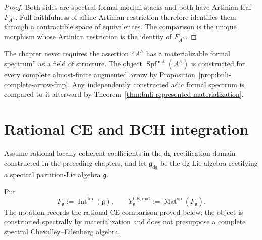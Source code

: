 \begin{proof}
Both sides are spectral formal-moduli stacks and both have Artinian leaf
$F_{A^\wedge}$.  Full faithfulness of affine Artinian restriction therefore
identifies them through a contractible space of equivalences.  The comparison
is the unique morphism whose Artinian restriction is the identity of
$F_{A^\wedge}$.
\end{proof}

\begin{remark}
The chapter never requires the assertion ``$A^\wedge$ has a materializable
formal spectrum'' as a field of structure.  The object
$\operatorname{Spf}^{\mathrm{mat}}(A^\wedge)$ is constructed for every
complete almost-finite augmented arrow by
Proposition~\ref{prop:bnli-complete-arrow-fmp}.  Any independently constructed
adic formal spectrum is compared to it afterward by
Theorem~\ref{thm:bnli-represented-materialization}.
\end{remark}

\section{Rational CE and BCH integration}
\label{sec:bnli-rational-integration}

Assume rational locally coherent coefficients in the dg rectification domain
constructed in the preceding chapters, and let $\mathfrak g_{\mathrm{dg}}$ be
the dg Lie algebra rectifying a spectral partition-Lie algebra $\mathfrak g$.

\begin{definition}
\label{def:bnli-materialized-ce-target}
Put
\[
    F_{\mathfrak g}
    :=
    \operatorname{Int}^{\mathrm{fm}}(\mathfrak g),
    \qquad
    Y^{\mathrm{CE,mat}}_{\mathfrak g}
    :=
    \operatorname{Mat}^{\mathrm{sp}}(F_{\mathfrak g}).
\]
The notation records the rational CE comparison proved below; the object is
constructed spectrally by materialization and does not presuppose a complete
spectral Chevalley--Eilenberg algebra.
\end{definition}

